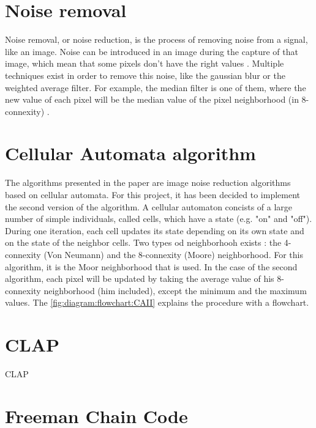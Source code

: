 \section{Noise removal}


Noise removal, or noise reduction, is the process of removing noise from a signal, like an image. Noise can be introduced in an image during the capture of that image, which mean that some pixels don't have the right values \cite{bib:noise:wikipedia}. Multiple techniques exist in order to remove this noise, like the gaussian blur or the weighted average filter. For example, the median filter is one of them, where the new value of each pixel will be the median value of the pixel neighborhood (in 8-connexity) \cite{bib:noise:ImageFiltering}.


\section{Cellular Automata algorithm}

The algorithms presented in the paper \cite{bib:filter:CA} are image noise reduction algorithms based on cellular automata. For this project, it has been decided to implement the second version of the algorithm. A cellular automaton concists of a large number of simple individuals, called cells, which have a state (e.g. "on" and "off"). During one iteration, each cell updates its state depending on its own state and on the state of the neighbor cells. Two types od neighborhooh exists : the 4-connexity (Von Neumann) and the 8-connexity (Moore) neighborhood. For this algorithm, it is the Moor neighborhood that is used. In the case of the second algorithm, each pixel will be updated by taking the average value of his 8-connexity neighborhood (him included), except the minimum and the maximum values. The \vref{fig:diagram:flowchart:CAII} explains the procedure with a flowchart.










\section{CLAP}


\gls{CLAP} \cite{bib:filter:EdgeWithCLAP}







\section{Freeman Chain Code}

